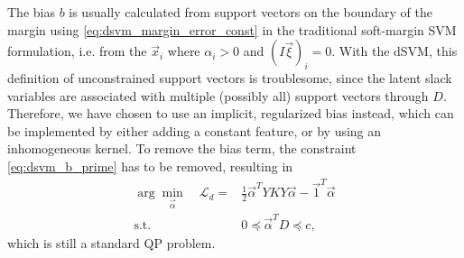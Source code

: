 The bias $b$ is usually calculated from support vectors on the
boundary of the margin using \eqref{eq:dsvm_margin_error_const} in the
traditional soft-margin \ac{SVM} formulation, i.e. from the $\vec{x}_i$ where
$\alpha_i > 0$ and $(I\vec{\xi})_i = 0$. 
%
%
With the \ac{dSVM}, this definition of unconstrained support vectors is
troublesome, since the latent slack variables are associated with multiple
(possibly all) support vectors through $D$. Therefore, we have chosen to use an
implicit, regularized bias instead, which can be implemented by either adding a
constant feature, or by using an inhomogeneous kernel. To remove the bias term,
the constraint \eqref{eq:dsvm_b_prime} has to be removed, resulting in
%
\begin{align}
  \arg\min_{\vec{\alpha}} \quad \mathcal{L}_d = & 
  \frac{1}{2} \vec{\alpha}^T Y K Y \vec{\alpha}
  - \vec{1}^T\vec{\alpha}
\\
  \text{s.t.} \quad &
  0 \preceq \vec{\alpha}^T D \preceq c,
\end{align}
which is still a standard \ac{QP} problem.

